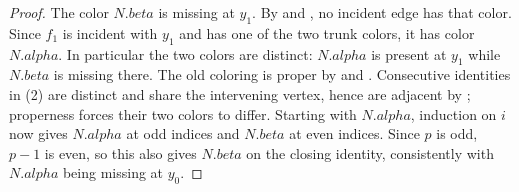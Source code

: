 \begin{proof}
The color $N.beta$ is missing at $y_1$.  By
 and , no incident edge has
that color.  Since $f_1$ is incident with $y_1$ and has one of the two
trunk colors, it has color $N.alpha$.  In particular the two colors are
distinct: $N.alpha$ is present at $y_1$ while $N.beta$ is missing there.
The old coloring is proper by  and
.  Consecutive identities in (2) are
distinct and share the intervening vertex, hence are adjacent by
; properness forces their two colors to differ.
Starting with $N.alpha$, induction on $i$ now gives $N.alpha$ at odd
indices and $N.beta$ at even indices.  Since $p$ is odd, $p-1$ is even,
so this also gives $N.beta$ on the closing identity, consistently with
$N.alpha$ being missing at $y_0$.
\end{proof}
